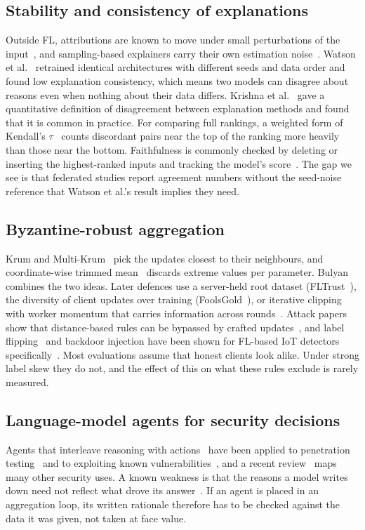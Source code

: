 \documentclass[conference]{IEEEtran}
\begin{document}
\subsection{Stability and consistency of explanations}
Outside FL, attributions are known to move under small perturbations of the
input~\cite{ghorbani2019,alvarezmelis2018}, and sampling-based explainers carry their own
estimation noise~\cite{slack2021}. Watson et al.~\cite{watson2022} retrained identical
architectures with different seeds and data order and found low explanation consistency,
which means two models can disagree about reasons even when nothing about their data
differs. Krishna et al.~\cite{krishna2024} gave a quantitative definition of disagreement between
explanation methods and found that it is common in practice. For comparing full
rankings, a weighted form of Kendall's $\tau$~\cite{kendall1938,vigna2015} counts
discordant pairs near the top of the ranking more heavily than those near the bottom. Faithfulness is commonly checked by deleting or inserting the
highest-ranked inputs and tracking the model's score~\cite{petsiuk2018}. The gap we see
is that federated studies report agreement numbers without the seed-noise reference
that Watson et al.'s result implies they need.

\subsection{Byzantine-robust aggregation}
Krum and Multi-Krum~\cite{blanchard2017} pick the updates closest to their neighbours,
and coordinate-wise trimmed mean~\cite{yin2018} discards extreme values per parameter.
Bulyan~\cite{mhamdi2018} combines the two ideas. Later defences use a server-held root
dataset (FLTrust~\cite{cao2021fltrust}), the diversity of client updates over training
(FoolsGold~\cite{fung2020}), or iterative clipping with worker momentum that carries
information across rounds~\cite{karimireddy2021}.
Attack papers show that distance-based rules can be bypassed by crafted
updates~\cite{fang2020local}, and label flipping~\cite{tolpegin2020} and backdoor
injection have been shown for FL-based IoT detectors specifically~\cite{nguyen2020poison}.
Most evaluations assume that honest clients look alike. Under strong label skew they do
not, and the effect of this on what these rules exclude is rarely measured.

\subsection{Language-model agents for security decisions}
Agents that interleave reasoning with actions~\cite{yao2023react} have been applied to
penetration testing~\cite{deng2024pentestgpt} and to exploiting known
vulnerabilities~\cite{fang2024oneday}, and a recent review~\cite{xu2026llmsec} maps many
other security uses. A known weakness is that the reasons a model writes down need not
reflect what drove its answer~\cite{turpin2023}. If an agent is placed in an aggregation
loop, its written rationale therefore has to be checked against the data it was given,
not taken at face value.
\end{document}

